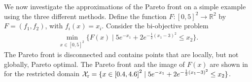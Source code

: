 \documentclass[main.tex]{subfiles}
\begin{document}
\begin{example}\label{ex:pareto_disconnected}
  We now investigate the approximations of the Pareto
  front on a simple example using the three different methods.
  Define the function
  $F:{[0,5]}^2\to\mathbb{R}^2$ by $F=(f_1,f_2)$, with $f_i(x)=x_i$.
  Consider the bi-objective problem
  \begin{align}
    \min_{x\in{[0,5]}^2}\{F(x)\mid
    5e^{-x_1}+2e^{-\frac{1}{2}{(x_1-3)}^2} \leq x_2\}.
  \end{align}
  The Pareto front is disconnected and contains points that are
  locally, but not globally, Pareto optimal. The Pareto front and the
  image of $F(x)$ are shown in  for
  the restricted domain $\mathcal{X}_{\textnormal{r}}=\{x\in {[0.4,4.6]}^2 \mid
  5e^{-x_1}+2e^{-\frac{1}{2}{(x_1-3)}^2} \leq x_2\}$.


\end{example}
\end{document}
